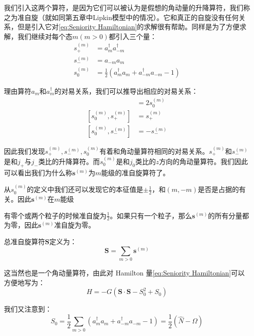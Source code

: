 我们引入这两个算符，是因为它们可以被认为是假想的角动量的升降算符，我们称之为准自旋（就如同第五章中Lipkin模型中的情况）。它和真正的自旋没有任何关系，但是引入它对\ref{eq:Seniority Hamiltonian}的求解很有帮助\cite{Ke61}。同样是为了方便求解，我们继续对每个态$m(m>0)$都引入三个量：
\begin{align*}
s^{(m)}_{+} & =a^{\dagger}_{m}a^{\dagger}_{-m}\\
s^{(m)}_{-} & =a_{-m}a_{m}\\
s^{(m)}_{0} & =\frac{1}{2}(a^{\dagger}_{m}a_{m}+a^{\dagger}_{-m}a_{-m}-1)
\end{align*}

理由算符$a_{m}$和$a^{\dagger}_{m}$的对易关系，我们可以推导出相应的对易关系：
\begin{align*}
[s^{(m)}_{+},s^{(m)}_{-}] & =2s^{(m)}_{0}\\{}
[s^{(m)}_{0},s^{(m)}_{+}] & =s^{(m)}_{+}\\{}
[s^{(m)}_{0},s^{(m)}_{-}] & =-s^{(m)}_{-}
\end{align*}

因此我们发现$s^{(m)}_{+},s^{(m)}_{-},s^{(m)}_{0}$有着和角动量算符相同的对易关系。$s^{(m)}_{+}$和$s^{(m)}_{-}$是和$j_{+}$与$j_{-}$类比的升降算符。而$s^{(m)}_{0}$是和$j_{0}$类比的$z$方向的角动量算符。我们因此可以看出我们为什么称$\boldsymbol{s}^{(m)}$为$m$能级的准自旋算符了。

从$s^{(m)}_{0}$的定义中我们还可以发现它的本征值是$\pm\frac{1}{2}$，和$(m,-m)$是否是占据的有关。因此$\boldsymbol{s}^{(m)}$在$m$能级

有零个或两个粒子的时候准自旋为$\frac{1}{2}$。如果只有一个粒子，那么$\boldsymbol{s}^{(m)}$的所有分量都为零，因此$\boldsymbol{s}^{(m)}$准自旋为零。

总准自旋算符$\boldsymbol{S}$定义为：
\begin{equation}
\boldsymbol{S}=\sum_{m>0}\boldsymbol{s}^{(m)}\label{eq:total quasi spin operator}
\end{equation}

这当然也是一个角动量算符，由此对 Hamilton 量\ref{eq:Seniority Hamiltonian}可以方便地写为：
\[
H=-G(\boldsymbol{S}\cdot\boldsymbol{S}-S^{2}_{0}+S_{0})
\]

我们又注意到：
\begin{equation}
S_{0}=\frac{1}{2}\sum_{m>0}(a^{\dagger}_{m}a_{m}+a^{\dagger}_{-m}a_{-m}-1)=\frac{1}{2}(\hat{N}-\Omega)\label{eq:S0}
\end{equation}

